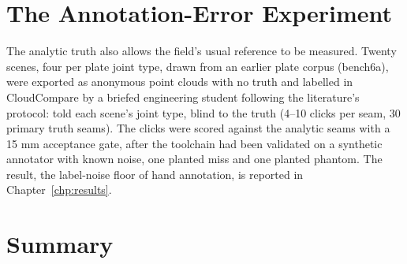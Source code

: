 \section{The Annotation-Error Experiment}
\label{sec:ws_annotation}
The analytic truth also allows the field's usual reference to be measured. Twenty scenes, four
per plate joint type, drawn from an earlier plate corpus (bench6a), were exported as anonymous point
clouds with no truth and labelled in CloudCompare by a briefed engineering student following the
literature's protocol: told each scene's joint type, blind to the truth (4--10 clicks per seam, 30
primary truth seams). The clicks were scored against the
analytic seams with a 15 mm acceptance gate, after the toolchain had been validated on a
synthetic annotator with known noise, one planted miss and one planted phantom. The result,
the label-noise floor of hand annotation, is reported in Chapter~\ref{chp:results}.

\section{Summary}
\label{sec:ws_summary}
